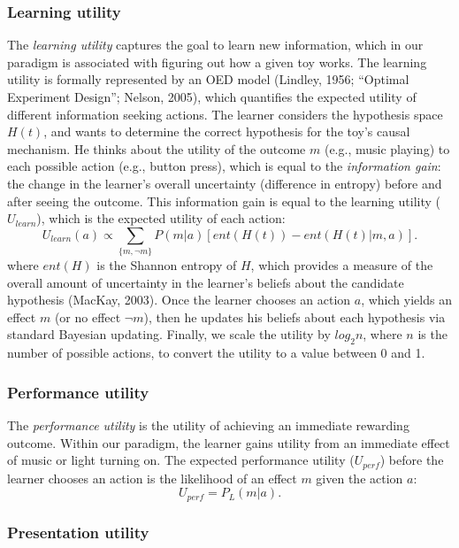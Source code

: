 \documentclass[10pt, letterpaper]{article}
\begin{document}
\subsubsection{Learning utility}\label{learning-utility}

The \emph{learning utility} captures the goal to learn new information,
which in our paradigm is associated with figuring out how a given toy
works. The learning utility is formally represented by an OED model
(Lindley, 1956; ``Optimal Experiment Design''; Nelson, 2005), which
quantifies the expected utility of different information seeking
actions. The learner considers the hypothesis space \(H(t)\), and wants
to determine the correct hypothesis for the toy's causal mechanism. He
thinks about the utility of the outcome \(m\) (e.g., music playing) to
each possible action (e.g., button press), which is equal to the
\emph{information gain}: the change in the learner's overall uncertainty
(difference in entropy) before and after seeing the outcome. This
information gain is equal to the learning utility (\(U_{learn}\)), which
is the expected utility of each action:
\[ U_{learn}(a) \propto \sum_{\{m, \neg m\}}{P(m|a)}[{ent(H(t)) - ent(H(t)|m,a)}].\]
\noindent
where \(ent(H)\) is the Shannon entropy of \(H\), which provides a
measure of the overall amount of uncertainty in the learner's beliefs
about the candidate hypothesis (MacKay, 2003). Once the learner chooses
an action \(a\), which yields an effect \(m\) (or no effect \(\neg m\)),
then he updates his beliefs about each hypothesis via standard Bayesian
updating. Finally, we scale the utility by \(log_2n\), where \(n\) is
the number of possible actions, to convert the utility to a value
between 0 and 1.

\subsubsection{Performance utility}\label{performance-utility}

The \emph{performance utility} is the utility of achieving an immediate
rewarding outcome. Within our paradigm, the learner gains utility from
an immediate effect of music or light turning on. The expected
performance utility (\(U_{perf}\)) before the learner chooses an action
is the likelihood of an effect \(m\) given the action \(a\):
\[ U_{perf} = P_L(m | a).\] \noindent

\subsubsection{Presentation utility}\label{presentation-utility}
\end{document}
